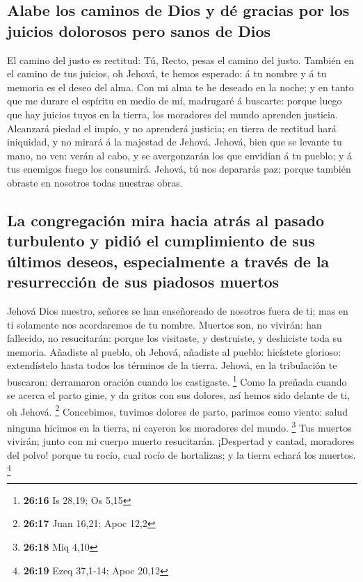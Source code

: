 \hypertarget{alabe-los-caminos-de-dios-y-duxe9-gracias-por-los-juicios-dolorosos-pero-sanos-de-dios}{%
\subsection{Alabe los caminos de Dios y dé gracias por los juicios
dolorosos pero sanos de
Dios}\label{alabe-los-caminos-de-dios-y-duxe9-gracias-por-los-juicios-dolorosos-pero-sanos-de-dios}}

 El camino del justo es rectitud: Tú, Recto, pesas el camino
del justo.  También en el camino de tus juicios, oh Jehová,
te hemos esperado: á tu nombre y á tu memoria es el deseo del alma.
 Con mi alma te he deseado en la noche; y en tanto que me
durare el espíritu en medio de mí, madrugaré á buscarte: porque luego
que hay juicios tuyos en la tierra, los moradores del mundo aprenden
justicia.  Alcanzará piedad el impío, y no aprenderá
justicia; en tierra de rectitud hará iniquidad, y no mirará á la
majestad de Jehová.  Jehová, bien que se levante tu mano,
no ven: verán al cabo, y se avergonzarán los que envidian á tu pueblo; y
á tus enemigos fuego los consumirá.  Jehová, tú nos
depararás paz; porque también obraste en nosotros todas nuestras obras.

\hypertarget{la-congregaciuxf3n-mira-hacia-atruxe1s-al-pasado-turbulento-y-pidiuxf3-el-cumplimiento-de-sus-uxfaltimos-deseos-especialmente-a-travuxe9s-de-la-resurrecciuxf3n-de-sus-piadosos-muertos}{%
\subsection{La congregación mira hacia atrás al pasado turbulento y
pidió el cumplimiento de sus últimos deseos, especialmente a través de
la resurrección de sus piadosos
muertos}\label{la-congregaciuxf3n-mira-hacia-atruxe1s-al-pasado-turbulento-y-pidiuxf3-el-cumplimiento-de-sus-uxfaltimos-deseos-especialmente-a-travuxe9s-de-la-resurrecciuxf3n-de-sus-piadosos-muertos}}

 Jehová Dios nuestro, señores se han enseñoreado de
nosotros fuera de ti; mas en ti solamente nos acordaremos de tu nombre.
 Muertos son, no vivirán: han fallecido, no resucitarán:
porque los visitaste, y destruiste, y deshiciste toda su memoria.
 Añadiste al pueblo, oh Jehová, añadiste al pueblo:
hicístete glorioso: extendístelo hasta todos los términos de la tierra.
 Jehová, en la tribulación te buscaron: derramaron oración
cuando los castigaste. \footnote{\textbf{26:16} Is 28,19; Os 5,15}
 Como la preñada cuando se acerca el parto gime, y da
gritos con sus dolores, así hemos sido delante de ti, oh Jehová.
\footnote{\textbf{26:17} Juan 16,21; Apoc 12,2} 
Concebimos, tuvimos dolores de parto, parimos como viento: salud ninguna
hicimos en la tierra, ni cayeron los moradores del mundo. \footnote{\textbf{26:18}
  Miq 4,10}  Tus muertos vivirán; junto con mi cuerpo
muerto resucitarán. ¡Despertad y cantad, moradores del polvo! porque tu
rocío, cual rocío de hortalizas; y la tierra echará los muertos.
\footnote{\textbf{26:19} Ezeq 37,1-14; Apoc 20,12}

